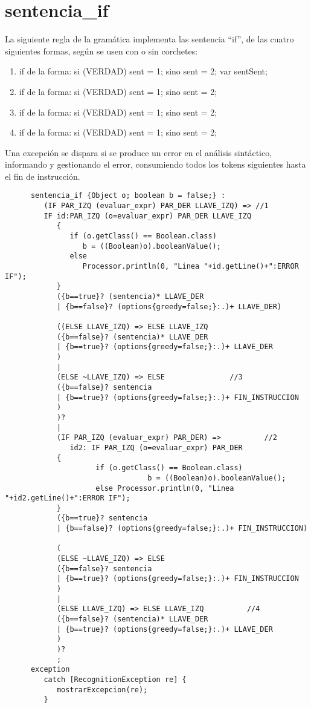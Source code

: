    \section{sentencia\_if}
   La siguiente regla de la gramática implementa las sentencia ``if'', de las cuatro siguientes formas, según se usen con o sin corchetes: 
   \begin{enumerate}
      \item if de la forma: si (VERDAD) { sent = 1; } sino { sent = 2; var sentSent; }
      \item if de la forma: si (VERDAD) sent = 1; sino sent = 2;
      \item if de la forma: si (VERDAD) {sent = 1; } sino sent = 2;
      \item if de la forma: si (VERDAD) sent = 1; sino { sent = 2; }
   \end{enumerate}
   Una excepción se dispara si se produce un error en el análisis sintáctico, informando y gestionando el error, consumiendo todos los 
   tokens siguientes hasta el fin de instrucción.
   \begin{lstlisting}
      sentencia_if {Object o; boolean b = false;} : 
         (IF PAR_IZQ (evaluar_expr) PAR_DER LLAVE_IZQ) => //1
         IF id:PAR_IZQ (o=evaluar_expr) PAR_DER LLAVE_IZQ
            {
               if (o.getClass() == Boolean.class)
                  b = ((Boolean)o).booleanValue();
               else 
                  Processor.println(0, "Linea "+id.getLine()+":ERROR IF");
            }
            ({b==true}? (sentencia)* LLAVE_DER
            | {b==false}? (options{greedy=false;}:.)+ LLAVE_DER) 
            
            ((ELSE LLAVE_IZQ) => ELSE LLAVE_IZQ
            ({b==false}? (sentencia)* LLAVE_DER
            | {b==true}? (options{greedy=false;}:.)+ LLAVE_DER
            )
            |
            (ELSE ~LLAVE_IZQ) => ELSE               //3
            ({b==false}? sentencia
            | {b==true}? (options{greedy=false;}:.)+ FIN_INSTRUCCION
            )
            )?
            |
            (IF PAR_IZQ (evaluar_expr) PAR_DER) =>          //2
               id2: IF PAR_IZQ (o=evaluar_expr) PAR_DER 
            {
                     if (o.getClass() == Boolean.class)
                                 b = ((Boolean)o).booleanValue();
                     else Processor.println(0, "Linea "+id2.getLine()+":ERROR IF");
            }
            ({b==true}? sentencia 
            | {b==false}? (options{greedy=false;}:.)+ FIN_INSTRUCCION)
            
            (
            (ELSE ~LLAVE_IZQ) => ELSE
            ({b==false}? sentencia
            | {b==true}? (options{greedy=false;}:.)+ FIN_INSTRUCCION  
            )
            |
            (ELSE LLAVE_IZQ) => ELSE LLAVE_IZQ          //4
            ({b==false}? (sentencia)* LLAVE_DER
            | {b==true}? (options{greedy=false;}:.)+ LLAVE_DER
            )
            )?
            ;
      exception
         catch [RecognitionException re] {
            mostrarExcepcion(re);
         }
   \end{lstlisting}

